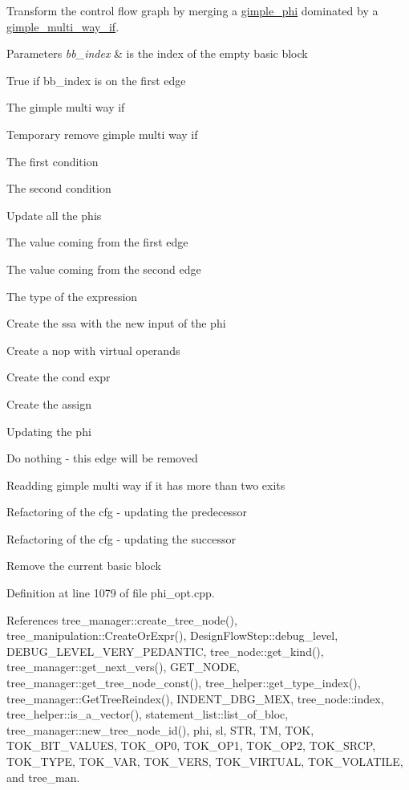 Transform the control flow graph by merging a \hyperlink{structgimple__phi}{gimple\+\_\+phi} dominated by a \hyperlink{structgimple__multi__way__if}{gimple\+\_\+multi\+\_\+way\+\_\+if}. 


\begin{DoxyParams}{Parameters}
{\em bb\+\_\+index} & is the index of the empty basic block \\
\hline
\end{DoxyParams}
True if bb\+\_\+index is on the first edge

The gimple multi way if

Temporary remove gimple multi way if

The first condition

The second condition

Update all the phis

The value coming from the first edge

The value coming from the second edge

The type of the expression

Create the ssa with the new input of the phi

Create a nop with virtual operands

Create the cond expr

Create the assign

Updating the phi

Do nothing -\/ this edge will be removed

Readding gimple multi way if it has more than two exits

Refactoring of the cfg -\/ updating the predecessor

Refactoring of the cfg -\/ updating the successor

Remove the current basic block 

Definition at line 1079 of file phi\+\_\+opt.\+cpp.



References tree\+\_\+manager\+::create\+\_\+tree\+\_\+node(), tree\+\_\+manipulation\+::\+Create\+Or\+Expr(), Design\+Flow\+Step\+::debug\+\_\+level, D\+E\+B\+U\+G\+\_\+\+L\+E\+V\+E\+L\+\_\+\+V\+E\+R\+Y\+\_\+\+P\+E\+D\+A\+N\+T\+IC, tree\+\_\+node\+::get\+\_\+kind(), tree\+\_\+manager\+::get\+\_\+next\+\_\+vers(), G\+E\+T\+\_\+\+N\+O\+DE, tree\+\_\+manager\+::get\+\_\+tree\+\_\+node\+\_\+const(), tree\+\_\+helper\+::get\+\_\+type\+\_\+index(), tree\+\_\+manager\+::\+Get\+Tree\+Reindex(), I\+N\+D\+E\+N\+T\+\_\+\+D\+B\+G\+\_\+\+M\+EX, tree\+\_\+node\+::index, tree\+\_\+helper\+::is\+\_\+a\+\_\+vector(), statement\+\_\+list\+::list\+\_\+of\+\_\+bloc, tree\+\_\+manager\+::new\+\_\+tree\+\_\+node\+\_\+id(), phi, sl, S\+TR, TM, T\+OK, T\+O\+K\+\_\+\+B\+I\+T\+\_\+\+V\+A\+L\+U\+ES, T\+O\+K\+\_\+\+O\+P0, T\+O\+K\+\_\+\+O\+P1, T\+O\+K\+\_\+\+O\+P2, T\+O\+K\+\_\+\+S\+R\+CP, T\+O\+K\+\_\+\+T\+Y\+PE, T\+O\+K\+\_\+\+V\+AR, T\+O\+K\+\_\+\+V\+E\+RS, T\+O\+K\+\_\+\+V\+I\+R\+T\+U\+AL, T\+O\+K\+\_\+\+V\+O\+L\+A\+T\+I\+LE, and tree\+\_\+man.



